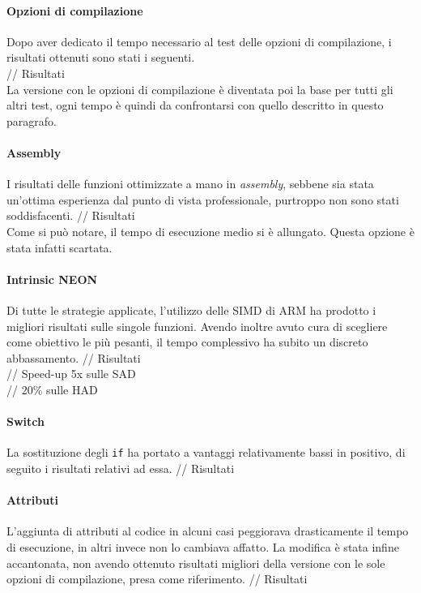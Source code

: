 \paragraph{Opzioni di compilazione \\}
  Dopo aver dedicato il tempo necessario al test delle opzioni di compilazione, 
  i risultati ottenuti sono stati i seguenti.\\
  // Risultati \\
  La versione con le opzioni di compilazione è diventata poi la base per tutti 
  gli altri test, ogni tempo è quindi da confrontarsi con quello descritto in 
  questo paragrafo.
  
\paragraph{Assembly \\}
  I risultati delle funzioni ottimizzate a mano in \emph{assembly}, sebbene sia 
  stata un'ottima esperienza dal punto di vista professionale, purtroppo non 
  sono stati soddisfacenti.
  // Risultati \\
  Come si può notare, il tempo di esecuzione medio si è allungato. Questa 
  opzione è stata infatti scartata.
  
\paragraph{Intrinsic NEON \\}
  Di tutte le strategie applicate, l'utilizzo delle SIMD di ARM ha prodotto i 
  migliori risultati sulle singole funzioni. Avendo inoltre avuto cura di 
  scegliere come obiettivo le più pesanti, il tempo complessivo ha subito un 
  discreto abbassamento.
  // Risultati \\
  // Speed-up 5x sulle SAD\\
  // 20\% sulle HAD\\
  
\paragraph{Switch \\}
  La sostituzione degli \verb|if| ha portato a vantaggi relativamente bassi in 
  positivo, di seguito i risultati relativi ad essa.
  // Risultati \\
  
\paragraph{Attributi \\}
  L'aggiunta di attributi al codice in alcuni casi peggiorava drasticamente il 
  tempo di esecuzione, in altri invece non lo cambiava affatto. La modifica è 
  stata infine accantonata, non avendo ottenuto risultati migliori della 
  versione con le sole opzioni di compilazione, presa come riferimento.
  // Risultati \\
  
